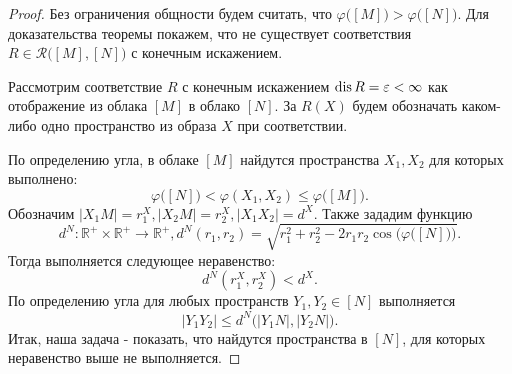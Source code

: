 \begin{proof}
  Без ограничения общности будем считать, что \( \varphi
  \big([M]\big)> \varphi \big([N]\big) \). Для доказательства теоремы
  покажем, что не существует соответствия \( R\in
  \mathcal{R}\big([M],[N]\big) \) с конечным искажением.

  Рассмотрим соответствие \( R \) с конечным искажением \( \operatorname{dis} R = \varepsilon
  < \infty \) как отображение из облака \( [M] \) в облако \( [N] \).
  За \( R(X) \) будем обозначать каком-либо одно пространство из
  образа \( X \) при соответствии.

  По определению угла, в облаке \( [M] \) найдутся пространства \(
  X_1, X_2 \) для которых выполнено:
  \[
    \varphi \big([N]\big) < \varphi (X_1, X_2) \le \varphi \big([M]\big).
  \]
  Обозначим \( |X_1 M| = r_1^X,  |X_2 M| = r_2^X, | X_1 X_2 | =
  d^X\). Также зададим функцию
  \[
    d^N \colon \mathbb{R}^+ \times
    \mathbb{R}^+ \rightarrow \mathbb{R}^+, d^N(r_1, r_2) =
    \sqrt{r_1^2 + r_2^2 - 2r_1r_2\cos\Big(\varphi \big([N]\big)\Big)}.
  \]
  Тогда выполняется следующее неравенство:
  \[
    d^N(r_1^X, r_2^X) < d^X.
  \]
  По определению угла для любых пространств \( Y_1, Y_2 \in [N] \) выполняется
  \begin{equation}
    | Y_1 Y_2 | \le d^N\big(| Y_1N |, | Y_2N |\big).
    \label{ineqAngle}
  \end{equation}
  Итак, наша задача - показать, что найдутся пространства в \( [N] \),
  для которых неравенство выше не выполняется.


\end{proof}

